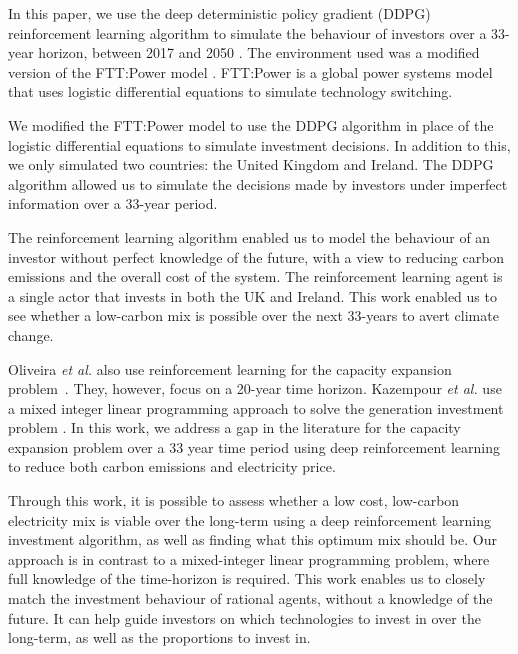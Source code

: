 \documentclass{article}
\begin{document}
In this paper, we use the deep deterministic policy gradient (DDPG) reinforcement learning algorithm to simulate the behaviour of investors over a 33-year horizon, between 2017 and 2050 \cite{Hunt2016a}. The environment used was a modified version of the FTT:Power model \cite{Mercure2012}. FTT:Power is a global power systems model that uses logistic differential equations to simulate technology switching. 

We modified the FTT:Power model to use the DDPG algorithm in place of the logistic differential equations to simulate investment decisions. In addition to this, we only simulated two countries: the United Kingdom and Ireland. The DDPG algorithm allowed us to simulate the decisions made by investors under imperfect information over a 33-year period. 

The reinforcement learning algorithm enabled us to model the behaviour of an investor without perfect knowledge of the future, with a view to reducing carbon emissions and the overall cost of the system. The reinforcement learning agent is a single actor that invests in both the UK and Ireland. This work enabled us to see whether a low-carbon mix is possible over the next 33-years to avert climate change.

Oliveira \textit{et al.} also use reinforcement learning for the capacity expansion problem~\cite{Oliveira2018}. They, however, focus on a 20-year time horizon. Kazempour \textit{et al.} use a mixed integer linear programming approach to solve the generation investment problem \cite{Kazempour2011}. In this work, we address a gap in the literature for the capacity expansion problem over a 33 year time period using deep reinforcement learning to reduce both carbon emissions and electricity price.

Through this work, it is possible to assess whether a low cost, low-carbon electricity mix is viable over the long-term using a deep reinforcement learning investment algorithm, as well as finding what this optimum mix should be. Our approach is in contrast to a mixed-integer linear programming problem, where full knowledge of the time-horizon is required. This work enables us to closely match the investment behaviour of rational agents, without a knowledge of the future. It can help guide investors on which technologies to invest in over the long-term, as well as the proportions to invest in.
\end{document}
